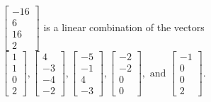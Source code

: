 \begin{exercise}
\begin{exerciseStatement}
  \end{exerciseStatement}
  \begin{exerciseAnswer}
   \(\left[\begin{array}{c}
-16 \\
6 \\
16 \\
2
\end{array}\right]\) 
  	 is  
	a linear combination of the vectors \(\left[\begin{array}{c}
1 \\
1 \\
0 \\
2
\end{array}\right] , \left[\begin{array}{c}
4 \\
-3 \\
-4 \\
-2
\end{array}\right] , \left[\begin{array}{c}
-5 \\
-1 \\
4 \\
-3
\end{array}\right] , \left[\begin{array}{c}
-2 \\
-2 \\
0 \\
0
\end{array}\right] , \text{ and } \left[\begin{array}{c}
-1 \\
0 \\
0 \\
2
\end{array}\right]\).

	
  


  \end{exerciseAnswer}
\end{exercise}
